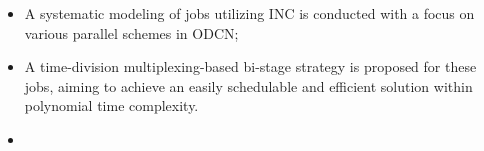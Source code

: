 \documentclass[conference]{IEEEtran}
\begin{document}
\begin{itemize}
	
	\item A systematic modeling of jobs utilizing INC is conducted with a focus on various parallel schemes in ODCN;
	
	
	\item A time-division multiplexing-based bi-stage strategy is proposed for these jobs, aiming to achieve an easily schedulable and efficient solution within polynomial time complexity.
	
	
	\item
\end{itemize}
\end{document}
